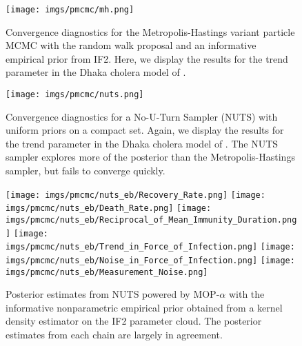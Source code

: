 
\begin{figure}[H]
    \centering
    \texttt{[image: imgs/pmcmc/mh.png]}
    \caption{Convergence diagnostics for the Metropolis-Hastings variant particle MCMC with the random walk proposal and an informative empirical prior from IF2. Here, we display the results for the trend parameter in the Dhaka cholera model of \cite{king08}.}
    \label{fig:mh}
\end{figure}


\begin{figure}[H]
    \centering
    \texttt{[image: imgs/pmcmc/nuts.png]}
    \caption{Convergence diagnostics for a No-U-Turn Sampler (NUTS) with uniform priors on a compact set. Again, we display the results for the trend parameter in the Dhaka cholera model of \cite{king08}. The NUTS sampler explores more of the posterior than the Metropolis-Hastings sampler, but fails to converge quickly.}
    \label{fig:nuts}
\end{figure}


\begin{figure}[H]
    \centering
    \texttt{[image: imgs/pmcmc/nuts\_eb/Recovery\_Rate.png]}
    \texttt{[image: imgs/pmcmc/nuts\_eb/Death\_Rate.png]}
    \texttt{[image: imgs/pmcmc/nuts\_eb/Reciprocal\_of\_Mean\_Immunity\_Duration.png]}
    \texttt{[image: imgs/pmcmc/nuts\_eb/Trend\_in\_Force\_of\_Infection.png]}
    \texttt{[image: imgs/pmcmc/nuts\_eb/Noise\_in\_Force\_of\_Infection.png]}
    \texttt{[image: imgs/pmcmc/nuts\_eb/Measurement\_Noise.png]}
    \caption{Posterior estimates from NUTS powered by MOP-$\alpha$ with the informative nonparametric empirical prior obtained from a kernel density estimator on the IF2 parameter cloud. The posterior estimates from each chain are largely in agreement.}
    \label{fig:posteriors}
\end{figure}

